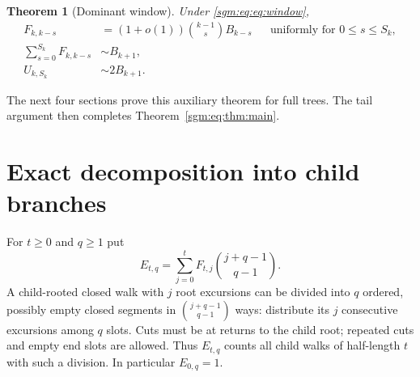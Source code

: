 \documentclass[11pt,letterpaper]{article}
\newtheorem{theorem}{Theorem}[section]
\theoremstyle{remark}\newtheorem{remark}[theorem]{Remark}
\theoremstyle{definition}\newtheorem{definition}[theorem]{Definition}
\begin{document}
\begin{theorem}[Dominant window]\label{sgm:eq:thm:window}
Under \eqref{sgm:eq:eq:window},
\begin{align}
 F_{k,k-s}&=(1+o(1))\binom{k-1}{s}B_{k-s}
 &&\text{uniformly for }0\le s\le S_k,\label{sgm:eq:eq:uniform}\\
 \sum_{s=0}^{S_k}F_{k,k-s}&\sim B_{k+1},\label{sgm:eq:eq:rootmain}\\
 U_{k,S_k}&\sim2B_{k+1}.\label{sgm:eq:eq:unionmain}
\end{align}
\end{theorem}
The next four sections prove this auxiliary theorem for full trees. The tail argument then completes Theorem~\ref{sgm:eq:thm:main}.
\section{Exact decomposition into child branches}\label{sgm:eq:sec:branches}
For $t\ge0$ and $q\ge1$ put
\begin{equation}\label{sgm:eq:eq:E}
 E_{t,q}=\sum_{j=0}^tF_{t,j}\binom{j+q-1}{q-1}.
\end{equation}
A child-rooted closed walk with $j$ root excursions can be divided into $q$ ordered, possibly empty closed segments in $\binom{j+q-1}{q-1}$ ways: distribute its $j$ consecutive excursions among $q$ slots. Cuts must be at returns to the child root; repeated cuts and empty end slots are allowed. Thus $E_{t,q}$ counts all child walks of half-length $t$ with such a division. In particular $E_{0,q}=1$.
\end{document}
